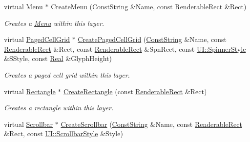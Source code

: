 \begin{DoxyCompactItemize}
virtual \hyperlink{classMezzanine_1_1UI_1_1Menu}{Menu} $\ast$ \hyperlink{classMezzanine_1_1UI_1_1Layer_a1afed25c24527f926959083fa23a61ea}{CreateMenu} (\hyperlink{namespaceMezzanine_a63cd699ac54b73953f35ec9cfc05e506}{ConstString} \&Name, const \hyperlink{structMezzanine_1_1UI_1_1RenderableRect}{RenderableRect} \&Rect)
\begin{DoxyCompactList}\small\item\em Creates a \hyperlink{classMezzanine_1_1UI_1_1Menu}{Menu} within this layer. \item\end{DoxyCompactList}\item 
virtual \hyperlink{classMezzanine_1_1UI_1_1PagedCellGrid}{PagedCellGrid} $\ast$ \hyperlink{classMezzanine_1_1UI_1_1Layer_a10917135a026ca597f5f5313a6ec4e10}{CreatePagedCellGrid} (\hyperlink{namespaceMezzanine_a63cd699ac54b73953f35ec9cfc05e506}{ConstString} \&Name, const \hyperlink{structMezzanine_1_1UI_1_1RenderableRect}{RenderableRect} \&Rect, const \hyperlink{structMezzanine_1_1UI_1_1RenderableRect}{RenderableRect} \&SpnRect, const \hyperlink{namespaceMezzanine_1_1UI_a62462d4df783dcdda77e1590a96bc6d6}{UI::SpinnerStyle} \&SStyle, const \hyperlink{namespaceMezzanine_a726731b1a7df72bf3583e4a97282c6f6}{Real} \&GlyphHeight)
\begin{DoxyCompactList}\small\item\em Creates a paged cell grid within this layer. \item\end{DoxyCompactList}\item 
virtual \hyperlink{classMezzanine_1_1UI_1_1Rectangle}{Rectangle} $\ast$ \hyperlink{classMezzanine_1_1UI_1_1Layer_a415a8cdf35364dff4948f22f42d81646}{CreateRectangle} (const \hyperlink{structMezzanine_1_1UI_1_1RenderableRect}{RenderableRect} \&Rect)
\begin{DoxyCompactList}\small\item\em Creates a rectangle within this layer. \item\end{DoxyCompactList}\item 
virtual \hyperlink{classMezzanine_1_1UI_1_1Scrollbar}{Scrollbar} $\ast$ \hyperlink{classMezzanine_1_1UI_1_1Layer_afdb47f6623a52471ec85e06148afb451}{CreateScrollbar} (\hyperlink{namespaceMezzanine_a63cd699ac54b73953f35ec9cfc05e506}{ConstString} \&Name, const \hyperlink{structMezzanine_1_1UI_1_1RenderableRect}{RenderableRect} \&Rect, const \hyperlink{namespaceMezzanine_1_1UI_a5998a9bf372a7e92605c0c461736e763}{UI::ScrollbarStyle} \&Style)

\end{DoxyCompactItemize}
